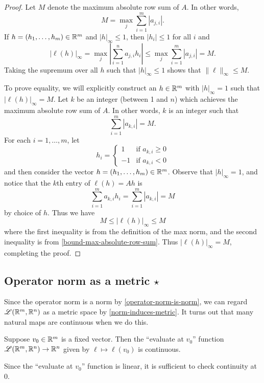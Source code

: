 \begin{proof}
	Let $M$ denote the maximum absolute row sum of $A$. In other words, 
	\[ M = \max_j \sum_{i = 1}^m |a_{j,i}|. \]
	If $h = (h_1, \dotsc, h_m) \in \mathbb{R}^m$ and $|h|_\infty \leq 1$, then $|h_i| \leq 1$ for all $i$ and
	\begin{equation} \label{bound-max-absolute-row-sum} |\ell(h)|_\infty = \max_j \left| \sum_{i = 1}^n a_{j,i} h_i \right|  \leq \max_j \sum_{i = 1}^m |a_{j,i}| = M. \end{equation}
	Taking the supremum over all $h$ such that $|h|_\infty \leq 1$ shows that $\|\ell\|_\infty \leq M$. 
	
	To prove equality, we will explicitly construct an $h \in \mathbb{R}^m$ with $|h|_\infty = 1$ such that $|\ell(h)|_\infty = M$. Let $k$ be an integer (between 1 and $n$) which achieves the maximum absolute row sum of $A$. In other words, $k$ is an integer such that
	\[ \sum_{i = 1}^m |a_{k,i}| = M. \]
	For each $i = 1, \dotsc, m$, let
	\[ h_i = \begin{cases} 1 & \text{if } a_{k, i} \geq 0 \\ -1 & \text{if } a_{k, i} < 0  \end{cases} \]
	and then consider the vector $h = (h_1, \dotsc, h_m) \in \mathbb{R}^m$. Observe that $|h|_\infty = 1$, and notice that the $k$th entry of $\ell(h) = Ah$ is 
	\[ \sum_{i = 1}^m a_{k,i} h_i = \sum_{i = 1}^m |a_{k,i}| = M \]
	by choice of $h$. Thus we have
	\[ M \leq |\ell(h)|_\infty \leq M \]
	where the first inequality is from the definition of the max norm, and the second inequality is from \cref{bound-max-absolute-row-sum}. Thus $|\ell(h)|_\infty = M$, completing the proof. 
\end{proof}

\subsection{Operator norm as a metric \texorpdfstring{$\star$}{*}}

Since the operator norm is a norm by \cref{operator-norm-is-norm}, we can regard $\mathscr{L}(\mathbb{R}^m, \mathbb{R}^n)$ as a metric space by \cref{norm-induces-metric}. It turns out that many natural maps are continuous when we do this. 

\begin{exercise} \label{evaluation-continuous}
	Suppose $v_0 \in \mathbb{R}^m$ is a fixed vector. Then the ``evaluate at $v_0$'' function $\mathscr{L}(\mathbb{R}^m, \mathbb{R}^n) \to \mathbb{R}^n$ given by $\ell \mapsto \ell(v_0)$ is continuous. \begin{hint} Since the ``evaluate at $v_0$'' function is linear, it is sufficient to check continuity at 0. \end{hint}
\end{exercise}

